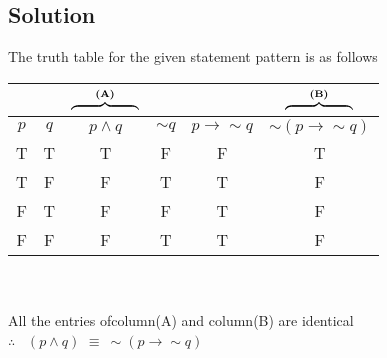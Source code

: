 \documentclass[17pt]{extarticle}
\newcommand{\lto}{\mathbin{\to}}
\begin{document}
\begin{fleqn}
\section{Solution}
The truth table for the given statement pattern is as follows \\
\begin{tabular}{|c*{5}{c|}}
\multicolumn{2}{c}{}&
\multicolumn{1}{c}{%
  $\overbrace{\hphantom{(p\land q)\lto p}}^{\textbf{(A)}}$ %
}
&\multicolumn{2}{c}{}&
\multicolumn{1}{c}{%
  $\overbrace{\hphantom{p\lto (p\lor q)}}^{\textbf{(B)}}$%
}\\
\hline
$p$ & $q$ & $p\land q$ & $ \sim q$ & $p\to \sim q$ & $\sim(p \to \sim q)$\\
\hline
 T & T & T & F & F & T\\
 T & F & F & T & T & F\\
 F & T & F & F & T & F\\
 F & F & F & T & T & F \\
 \hline
\end{tabular} \\ \\
All the entries ofcolumn(A) and column(B) are identical \\
$\therefore$ \ $(p \wedge q) $ $ \equiv \ \sim(p \to \sim q)$ 
\begin{equation} \nonumber
\end{equation}



\end{fleqn}
\end{document}

